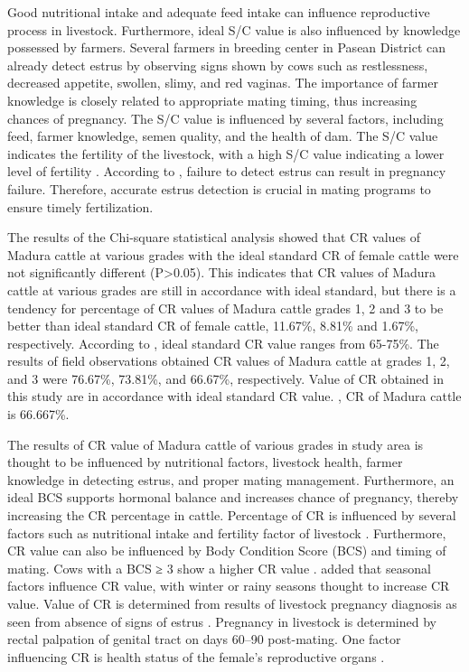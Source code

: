 \documentclass[9pt,article,twoside]{fapet-rho-class/fapet-rho}
\begin{document}
Good nutritional intake and adequate feed intake can influence reproductive process in livestock. Furthermore, ideal S/C value is also influenced by knowledge possessed by farmers. Several farmers in breeding center in Pasean District can already detect estrus by observing signs shown by cows such as restlessness, decreased appetite, swollen, slimy, and red vaginas. The importance of farmer knowledge is closely related to appropriate mating timing, thus increasing chances of pregnancy. The S/C value is influenced by several factors, including feed, farmer knowledge, semen quality, and the health of dam. The S/C value indicates the fertility of the livestock, with a high S/C value indicating a lower level of fertility \citep{Wanma2022}. According to \citet{Jurame2018}, failure to detect estrus can result in pregnancy failure. Therefore, accurate estrus detection is crucial in mating programs to ensure timely fertilization.

The results of the Chi-square statistical analysis showed that CR values of Madura cattle at various grades with the ideal standard CR of female cattle were not significantly different (P>0.05). This indicates that CR values of Madura cattle at various grades are still in accordance with ideal standard, but there is a tendency for percentage of CR values of Madura cattle grades 1, 2 and 3 to be better than ideal standard CR of female cattle, 11.67\%, 8.81\% and 1.67\%, respectively. According to \citet{Tophianong2023}, ideal standard CR value ranges from 65-75\%. The results of field observations obtained CR values of Madura cattle at grades 1, 2, and 3 were 76.67\%, 73.81\%, and 66.67\%, respectively. Value of CR obtained in this study are in accordance with ideal standard CR value. \citet{Wulansari2023}, CR of Madura cattle is 66.667\%.

The results of CR value of Madura cattle of various grades in study area is thought to be influenced by nutritional factors, livestock health, farmer knowledge in detecting estrus, and proper mating management. Furthermore, an ideal BCS supports hormonal balance and increases chance of pregnancy, thereby increasing the CR percentage in cattle. Percentage of CR is influenced by several factors such as nutritional intake and fertility factor of livestock \citep{Prasdini2018}. Furthermore, CR value can also be influenced by Body Condition Score (BCS) and timing of mating. Cows with a BCS ≥ 3 show a higher CR value \citep{Martini2022}. \citet{Samkange2019} added that seasonal factors influence CR value, with winter or rainy seasons thought to increase CR value. Value of CR is determined from results of livestock pregnancy diagnosis as seen from absence of signs of estrus \citep{Asfar2023}. Pregnancy in livestock is determined by rectal palpation of genital tract on days 60–90 post-mating. One factor influencing CR is health status of the female's reproductive organs \citep{Khan2015}.
\end{document}
